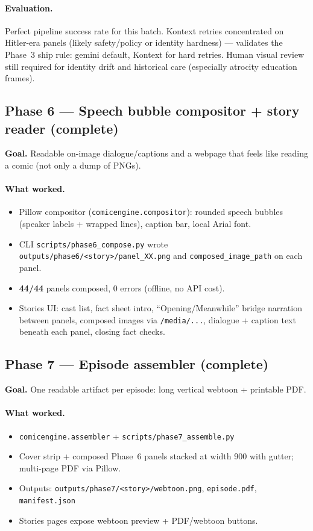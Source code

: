 \documentclass[10pt,twocolumn,letterpaper]{article}
\begin{document}
\paragraph{Evaluation.} Perfect pipeline success rate for this batch. Kontext retries concentrated on Hitler-era panels (likely safety/policy or identity hardness) --- validates the Phase~3 ship rule: gemini default, Kontext for hard retries. Human visual review still required for identity drift and historical care (especially atrocity education frames).

\subsection{Phase 6 --- Speech bubble compositor + story reader (complete)}
\textbf{Goal.} Readable on-image dialogue/captions and a webpage that feels like reading a comic (not only a dump of PNGs).

\paragraph{What worked.}
\begin{itemize}[leftmargin=*,itemsep=1pt]
  \item Pillow compositor (\texttt{comicengine.compositor}): rounded speech bubbles (speaker labels + wrapped lines), caption bar, local Arial font.
  \item CLI \texttt{scripts/phase6\_compose.py} wrote \texttt{outputs/phase6/<story>/panel\_XX.png} and \texttt{composed\_image\_path} on each panel.
  \item \textbf{44/44} panels composed, 0 errors (offline, no API cost).
  \item Stories UI: cast list, fact sheet intro, ``Opening/Meanwhile'' bridge narration between panels, composed images via \texttt{/media/...}, dialogue + caption text beneath each panel, closing fact checks.
\end{itemize}

\subsection{Phase 7 --- Episode assembler (complete)}
\textbf{Goal.} One readable artifact per episode: long vertical webtoon + printable PDF.

\paragraph{What worked.}
\begin{itemize}[leftmargin=*,itemsep=1pt]
  \item \texttt{comicengine.assembler} + \texttt{scripts/phase7\_assemble.py}
  \item Cover strip + composed Phase~6 panels stacked at width 900 with gutter; multi-page PDF via Pillow.
  \item Outputs: \texttt{outputs/phase7/<story>/webtoon.png}, \texttt{episode.pdf}, \texttt{manifest.json}
  \item Stories pages expose webtoon preview + PDF/webtoon buttons.
\end{itemize}
\end{document}
